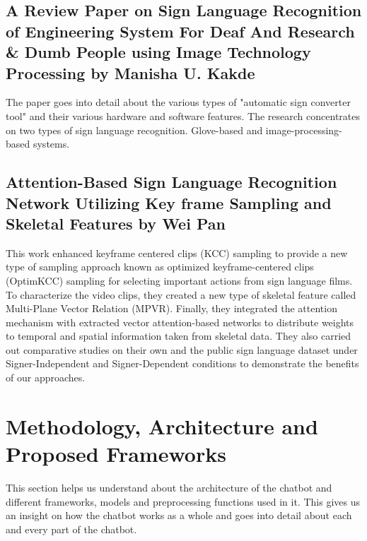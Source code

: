 \documentclass[12pt,a4paper]{report}
\begin{document}
\subsection{A Review Paper on Sign Language Recognition of Engineering System For Deaf And Research \& Dumb People using Image Technology Processing by Manisha U. Kakde\cite{b3}}
The paper goes into detail about the various types of "automatic sign converter tool" and their various hardware and software features. The research concentrates on two types of sign language recognition. Glove-based and image-processing-based systems.

\subsection{Attention-Based Sign Language Recognition Network Utilizing Key frame Sampling and Skeletal Features by Wei Pan\cite{b4}}
This work enhanced keyframe centered clips (KCC) sampling to provide a new type of sampling approach known as optimized keyframe-centered clips (OptimKCC) sampling for selecting important actions from sign language films. To characterize the video clips, they created a new type of skeletal feature called Multi-Plane Vector Relation (MPVR). Finally, they integrated the attention mechanism with extracted vector attention-based networks to distribute weights to temporal and spatial information taken from skeletal data. They also carried out comparative studies on their own and the public sign language dataset under Signer-Independent and Signer-Dependent conditions to demonstrate the benefits of our approaches.

\section{Methodology, Architecture and Proposed Frameworks}
This section helps us understand about the architecture of the chatbot and different frameworks, models and preprocessing functions used in it. This gives us an insight on how the chatbot works as a whole and goes into detail about each and every part of the chatbot.
\end{document}

